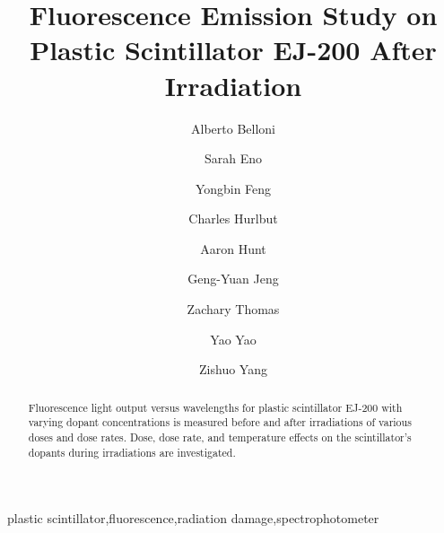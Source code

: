 \documentclass[review]{elsarticle}
\begin{document}
\begin{frontmatter}



\title{Fluorescence Emission Study on Plastic Scintillator EJ-200 After Irradiation}


\author[umd]{Alberto Belloni}
\author[umd]{Sarah Eno}
\author[umd]{Yongbin Feng}
\author[eljen]{Charles Hurlbut}
\author[umd]{Aaron Hunt}
\author[umd]{Geng-Yuan Jeng}
\author[umd]{Zachary Thomas}
\author[umd]{Yao Yao}
\author[umd]{Zishuo Yang}

\address[umd]{Department of Physics, University of Maryland, College Park, MD 20740, USA}
\address[eljen]{Eljen Technology, 1300 W. Broadway, Sweetwater, TX 79556, USA}

\begin{abstract}
Fluorescence light output versus wavelengths for plastic scintillator EJ-200 with varying dopant concentrations is measured 
before and after irradiations of various doses and dose rates. 
Dose, dose rate, and temperature effects on the scintillator's dopants during irradiations are investigated.
\end{abstract}

\begin{keyword}
plastic scintillator\sep fluorescence\sep radiation damage\sep spectrophotometer

\end{keyword}

\end{frontmatter}
\end{document}
